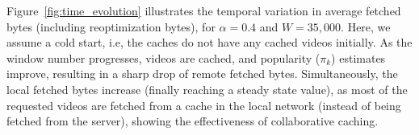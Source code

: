\documentclass[conference]{IEEEtran}
\begin{document}





Figure~\ref{fig:time_evolution} illustrates the temporal variation in average fetched bytes (including reoptimization bytes), for $\alpha = 0.4$ and $W = 35,000$. Here, we assume a cold start, i.e, the caches do not have any cached videos initially. As the window number progresses, videos are cached, and popularity ($\pi_k$) estimates improve, resulting in a sharp drop of remote fetched bytes. Simultaneously, the local fetched bytes increase (finally reaching a steady state value), as most of the requested videos are fetched from a cache in the local network (instead of being fetched from the server), showing the effectiveness of collaborative caching. 
\end{document}
